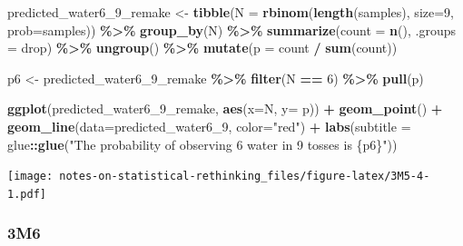 \documentclass[
]{book}
\newenvironment{Shaded}{\begin{snugshade}}{\end{snugshade}}
\newcommand{\DataTypeTok}[1]{\textcolor[rgb]{0.13,0.29,0.53}{#1}}
\newcommand{\DecValTok}[1]{\textcolor[rgb]{0.00,0.00,0.81}{#1}}
\newcommand{\KeywordTok}[1]{\textcolor[rgb]{0.13,0.29,0.53}{\textbf{#1}}}
\newcommand{\NormalTok}[1]{#1}
\newcommand{\OperatorTok}[1]{\textcolor[rgb]{0.81,0.36,0.00}{\textbf{#1}}}
\newcommand{\StringTok}[1]{\textcolor[rgb]{0.31,0.60,0.02}{#1}}
\begin{document}
\begin{Shaded}
\begin{Highlighting}[]
\NormalTok{predicted\_water6\_}\DecValTok{9}\NormalTok{\_remake \textless{}{-}}\StringTok{ }
\StringTok{  }\KeywordTok{tibble}\NormalTok{(}\DataTypeTok{N =} \KeywordTok{rbinom}\NormalTok{(}\KeywordTok{length}\NormalTok{(samples), }\DataTypeTok{size=}\DecValTok{9}\NormalTok{, }\DataTypeTok{prob=}\NormalTok{samples)) }\OperatorTok{\%\textgreater{}\%}
\StringTok{  }\KeywordTok{group\_by}\NormalTok{(N) }\OperatorTok{\%\textgreater{}\%}
\StringTok{  }\KeywordTok{summarize}\NormalTok{(}\DataTypeTok{count =} \KeywordTok{n}\NormalTok{(), }\DataTypeTok{.groups =} \StringTok{\textquotesingle{}drop\textquotesingle{}}\NormalTok{)  }\OperatorTok{\%\textgreater{}\%}
\StringTok{  }\KeywordTok{ungroup}\NormalTok{() }\OperatorTok{\%\textgreater{}\%}
\StringTok{  }\KeywordTok{mutate}\NormalTok{(}\DataTypeTok{p =}\NormalTok{ count }\OperatorTok{/}\StringTok{ }\KeywordTok{sum}\NormalTok{(count))}
  
\NormalTok{p6 \textless{}{-}}\StringTok{ }
\StringTok{  }\NormalTok{predicted\_water6\_}\DecValTok{9}\NormalTok{\_remake }\OperatorTok{\%\textgreater{}\%}
\StringTok{  }\KeywordTok{filter}\NormalTok{(N }\OperatorTok{==}\StringTok{ }\DecValTok{6}\NormalTok{) }\OperatorTok{\%\textgreater{}\%}
\StringTok{  }\KeywordTok{pull}\NormalTok{(p)}

\KeywordTok{ggplot}\NormalTok{(predicted\_water6\_}\DecValTok{9}\NormalTok{\_remake, }\KeywordTok{aes}\NormalTok{(}\DataTypeTok{x=}\NormalTok{N, }\DataTypeTok{y=}\NormalTok{ p)) }\OperatorTok{+}\StringTok{ }
\StringTok{  }\KeywordTok{geom\_point}\NormalTok{() }\OperatorTok{+}\StringTok{ }
\StringTok{  }\KeywordTok{geom\_line}\NormalTok{(}\DataTypeTok{data=}\NormalTok{predicted\_water6\_}\DecValTok{9}\NormalTok{, }\DataTypeTok{color=}\StringTok{"red"}\NormalTok{) }\OperatorTok{+}
\StringTok{  }\KeywordTok{labs}\NormalTok{(}\DataTypeTok{subtitle =}\NormalTok{ glue}\OperatorTok{::}\KeywordTok{glue}\NormalTok{(}\StringTok{"The probability of observing 6 water in 9 tosses is \{p6\}"}\NormalTok{))}
\end{Highlighting}
\end{Shaded}

\texttt{[image: notes-on-statistical-rethinking\_files/figure-latex/3M5-4-1.pdf]}

\hypertarget{m6-1}{%
\subsubsection*{3M6}\label{m6-1}}
\end{document}
